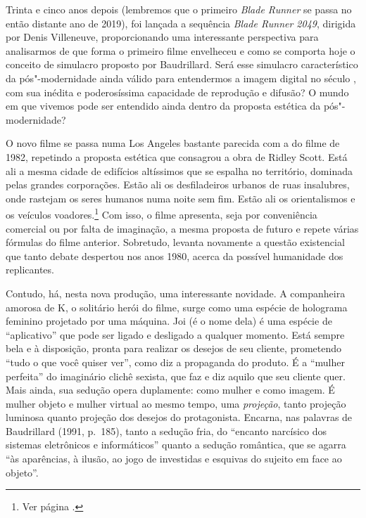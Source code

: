Trinta e cinco anos depois (lembremos que o primeiro \emph{Blade Runner}
se passa no então distante ano de 2019), foi lançada a sequência
\emph{Blade Runner 2049}, dirigida por Denis Villeneuve, proporcionando
uma interessante perspectiva para analisarmos de que forma o primeiro
filme envelheceu e como se comporta hoje o conceito de simulacro
proposto por Baudrillard. Será esse simulacro característico da
pós"-modernidade ainda válido para entendermos a imagem digital no século
, com sua inédita e poderosíssima capacidade de reprodução e difusão?
O mundo em que vivemos pode ser entendido ainda dentro da proposta
estética da pós"-modernidade?

O novo filme se passa numa Los Angeles bastante parecida com a do filme
de 1982, repetindo a proposta estética que consagrou a obra de Ridley
Scott. Está ali a mesma cidade de edifícios altíssimos que se espalha no
território, dominada pelas grandes corporações. Estão ali os
desfiladeiros urbanos de ruas insalubres, onde rastejam os seres humanos
numa noite sem fim. Estão ali os orientalismos e os veículos
voadores.\footnote{Ver página \pageref{cyberpunk}.} Com isso, o filme apresenta, seja por
conveniência comercial ou por falta de imaginação, a mesma proposta de
futuro e repete várias fórmulas do filme anterior. Sobretudo, levanta
novamente a questão existencial que tanto debate despertou nos anos
1980, acerca da possível humanidade dos replicantes.

Contudo, há, nesta nova produção, uma interessante novidade. A
companheira amorosa de K, o solitário herói do filme, surge como uma
espécie de holograma feminino projetado por uma máquina. Joi (é o nome
dela) é uma espécie de ``aplicativo'' que pode ser ligado e desligado a
qualquer momento. Está sempre bela e à disposição, pronta para realizar
os desejos de seu cliente, prometendo ``tudo o que você quiser ver'',
como diz a propaganda do produto. É a ``mulher perfeita'' do imaginário
clichê sexista, que faz e diz aquilo que seu cliente quer. Mais ainda,
sua sedução opera duplamente: como mulher e como imagem. É mulher objeto
e mulher virtual ao mesmo tempo, uma \emph{projeção}, tanto projeção
luminosa quanto projeção dos desejos do protagonista. Encarna, nas
palavras de Baudrillard (1991, p.~185), tanto a sedução fria, do
``encanto narcísico dos sistemas eletrônicos e informáticos'' quanto a
sedução romântica, que se agarra ``às aparências, à ilusão, ao jogo de
investidas e esquivas do sujeito em face ao objeto''.

